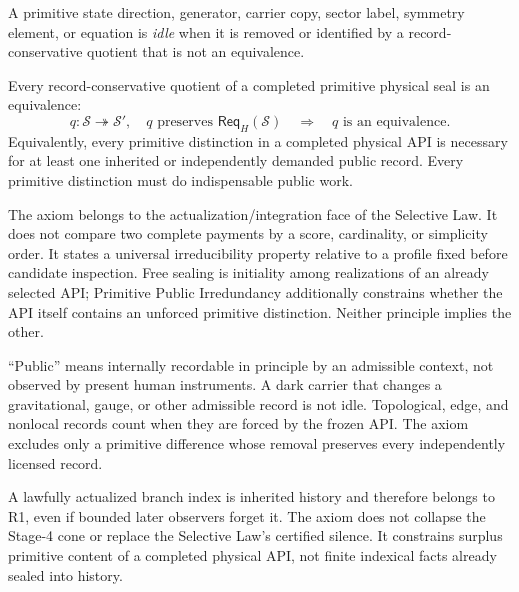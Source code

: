\begin{definition}
A primitive state direction, generator, carrier copy, sector label, symmetry
element, or equation is \emph{idle} when it is removed or identified by a
record-conservative quotient that is not an equivalence.
\end{definition}

\begin{axiom}
\label{ax:primitive-public-irredundancy}
Every record-conservative quotient of a completed primitive physical seal is an
equivalence:
\[
 \boxed{
 q:\mathcal S\twoheadrightarrow\mathcal S',
 \quad
 q\text{ preserves }\mathsf{Req}_H(\mathcal S)
 \quad\Longrightarrow\quad
 q\text{ is an equivalence}.}
\]
Equivalently, every primitive distinction in a completed physical API is necessary
for at least one inherited or independently demanded public record.  Every primitive
distinction must do indispensable public work.
\end{axiom}

\begin{remark}
The axiom belongs to the actualization/integration face of the Selective Law.  It
does not compare two complete payments by a score, cardinality, or simplicity
order.  It states a universal irreducibility property relative to a profile fixed
before candidate inspection.  Free sealing is initiality among realizations of an
already selected API; Primitive Public Irredundancy additionally constrains whether
the API itself contains an unforced primitive distinction.  Neither principle
implies the other.
\end{remark}

\begin{remark}
``Public'' means internally recordable in principle by an admissible context, not
observed by present human instruments.  A dark carrier that changes a gravitational,
gauge, or other admissible record is not idle.  Topological, edge, and nonlocal
records count when they are forced by the frozen API.  The axiom excludes only a
primitive difference whose removal preserves every independently licensed record.
\end{remark}

\begin{remark}
A lawfully actualized branch index is inherited history and therefore belongs to R1,
even if bounded later observers forget it.  The axiom does not collapse the
Stage-4 cone or replace the Selective Law's certified silence.  It constrains surplus
primitive content of a completed physical API, not finite indexical facts already
sealed into history.
\end{remark}

